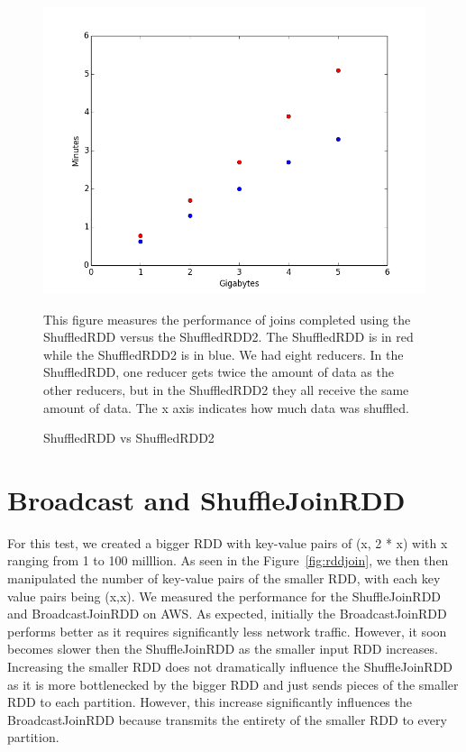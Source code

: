 \begin{figure}[h]
\begin{center}
\includegraphics[scale=0.6]{./img/distributedshuffle.png}
\caption{ShuffledRDD vs ShuffledRDD2}
\label{fig:distributed}
\end{center}
This figure measures the performance of joins completed using the ShuffledRDD versus the ShuffledRDD2.
The ShuffledRDD is in red while the ShuffledRDD2 is in blue. We had eight reducers. In the ShuffledRDD, one reducer gets twice the amount of
data as the other reducers, but in the ShuffledRDD2 they all receive the same amount of data. The x axis indicates how much data was
shuffled.  
\end{figure}


\section{Broadcast and ShuffleJoinRDD}

For this test, we created a bigger RDD with key-value pairs of (x, 2 * x) with x ranging from 1 to 100 milllion.
As seen in the Figure~\ref{fig:rddjoin}, we then then manipulated the number of key-value pairs of the smaller RDD, 
with each key value pairs being (x,x). We measured the performance for the ShuffleJoinRDD and BroadcastJoinRDD on AWS. 
As expected, initially the BroadcastJoinRDD performs better as it requires significantly less network traffic.
However, it soon becomes slower then the ShuffleJoinRDD as the smaller input RDD increases.
Increasing the smaller RDD does not dramatically influence the ShuffleJoinRDD as it is more bottlenecked by the bigger RDD and just
sends pieces of the smaller RDD to each partition. However, this increase significantly influences the BroadcastJoinRDD 
because transmits the entirety of the smaller RDD to every partition.

